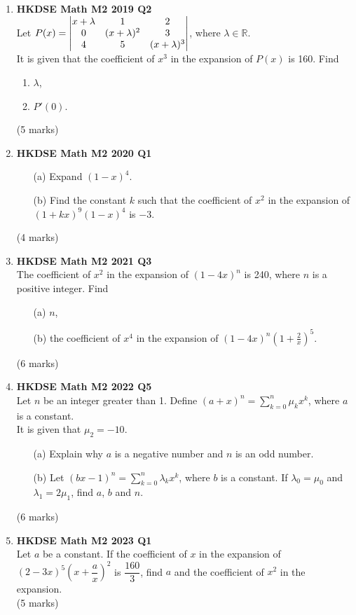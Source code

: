 \documentclass{report}
\begin{document}
\begin{enumerate}
	\newpage

	\item \textbf{HKDSE Math M2 2019 Q2}\\
	Let $P(x) = \begin{vmatrix}
		x+\lambda & 1 & 2  \\ 
		0 & (x+\lambda)^2 & 3 \\ 
		4 & 5 & (x+\lambda)^3  \notag
		\end{vmatrix}$, where $\lambda \in \mathbb{R}$. \\
	It is given that the coefficient of $x^3$ in the expansion of $P(x)$ is 160. Find
	\begin{enumerate}
		\item $\lambda$,
		\item $P'(0)$. 
	\end{enumerate}
	(5 marks)

	\item \textbf{HKDSE Math M2 2020 Q1}
	\begin{enumerate}
		\item [(a)] Expand $(1-x)^4$.
		\item [(b)] Find the constant $k$ such that the coefficient of $x^2$ in the expansion of $(1+kx)^9(1-x)^4$ is $-3$.
	\end{enumerate}
	(4 marks)

	\item \textbf{HKDSE Math M2 2021 Q3}\\
	The coefficient of $x^2$ in the expansion of $(1-4x)^n$ is 240, where $n$ is a positive integer. Find
	\begin{enumerate}
		\item[(a)]
		$n$,
		\item[(b)]
		the coefficient of $x^4$ in the expansion of $\displaystyle(1-4x)^n\left(1+\frac{2}{x}\right)^5$. 
	\end{enumerate}
	(6 marks)
	
	\item \textbf{HKDSE Math M2 2022 Q5}\\
	Let $n$ be an integer greater than 1. Define $\displaystyle (a+x)^n  = \sum_{k = 0}^{n} \mu_k x^k$, where $a$ is a constant. \\
	It is given that $\mu_2 = -10$.
	\begin{enumerate}
		\item [(a)] Explain why $a$ is a negative number and $n$ is an odd number. 
		\item [(b)] Let $\displaystyle (bx-1)^n  = \sum_{k = 0}^{n} \lambda_k x^k$, where $b$ is a constant. If $\lambda_0 = \mu_0$ and $\lambda_1 = 2\mu_1$, find $a$, $b$ and $n$.
	\end{enumerate}
	(6 marks)

	\item \textbf{HKDSE Math M2 2023 Q1}\\
	Let $a$ be a constant. If the coefficient of $x$ in the expansion of $(2-3x)^5\left(x + \dfrac{a}{x}\right)^2$ is $\dfrac{160}{3}$, find $a$ and the coefficient of $x^2$ in the expansion.\\
	(5 marks)

\end{enumerate}
\end{document}
